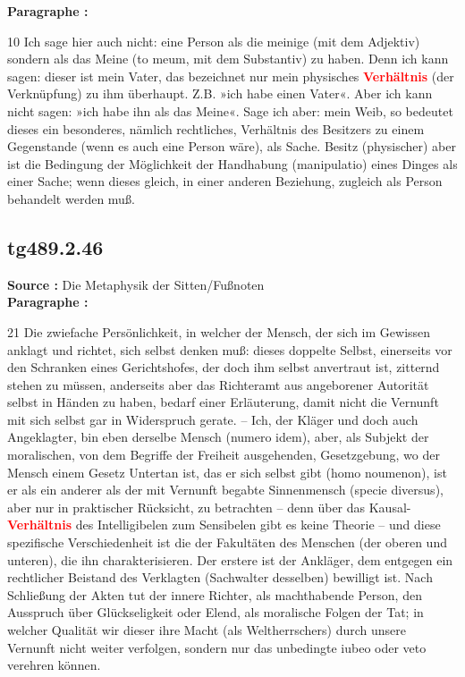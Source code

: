 \documentclass[a4paper,12pt,twoside]{book}
\newcommand{\match}[1]{\textcolor{red}{\textbf{#1}}}
\begin{document}
	\textbf{Paragraphe : }
	
	10 Ich sage hier auch nicht: eine Person als die meinige (mit dem Adjektiv) sondern als das Meine (to meum, mit dem Substantiv) zu haben. Denn ich kann sagen: dieser ist mein Vater, das bezeichnet nur mein physisches \match{Verhältnis} (der Verknüpfung) zu ihm überhaupt. Z.B. »ich habe einen Vater«. Aber ich kann nicht sagen: »ich habe ihn als das Meine«. Sage ich aber: mein Weib, so bedeutet dieses ein besonderes, nämlich rechtliches, Verhältnis des Besitzers zu einem Gegenstande (wenn es auch eine Person wäre), als Sache. Besitz (physischer) aber ist die Bedingung der Möglichkeit der Handhabung (manipulatio) eines Dinges als einer Sache; wenn dieses gleich, in einer anderen Beziehung, zugleich als Person behandelt werden muß. 
	
	\subsection*{tg489.2.46} 
	\textbf{Source : }Die Metaphysik der Sitten/Fußnoten\\  
	
	\textbf{Paragraphe : }
	
	21 Die zwiefache Persönlichkeit, in welcher der Mensch, der sich im Gewissen anklagt und richtet, sich selbst denken muß: dieses doppelte Selbst, einerseits vor den Schranken eines Gerichtshofes, der doch ihm selbst anvertraut ist, zitternd stehen zu müssen, anderseits aber das Richteramt aus angeborener Autorität selbst in Händen zu haben, bedarf einer Erläuterung, damit nicht die Vernunft mit sich selbst gar in Widerspruch gerate. – Ich, der Kläger und doch auch Angeklagter, bin eben derselbe Mensch (numero idem), aber, als Subjekt der moralischen, von dem Begriffe der Freiheit ausgehenden, Gesetzgebung, wo der Mensch einem Gesetz Untertan ist, das er sich selbst gibt (homo noumenon), ist er als ein anderer als der mit Vernunft begabte Sinnenmensch (specie diversus), aber nur in praktischer Rücksicht, zu betrachten – denn über das Kausal-\match{Verhältnis} des Intelligibelen zum Sensibelen gibt es keine Theorie – und diese spezifische Verschiedenheit ist die der Fakultäten des Menschen (der oberen und unteren), die ihn charakterisieren. Der erstere ist der Ankläger, dem entgegen ein rechtlicher Beistand des Verklagten (Sachwalter desselben) bewilligt ist. Nach Schließung der Akten tut der innere Richter, als machthabende Person, den Ausspruch über Glückseligkeit oder Elend, als moralische Folgen der Tat; in welcher Qualität wir dieser ihre Macht (als Weltherrschers) durch unsere Vernunft nicht weiter verfolgen, sondern nur das unbedingte iubeo oder veto verehren können. 
	
\end{document}
